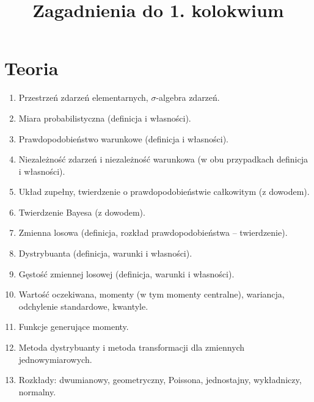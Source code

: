 \documentclass[polish]{article}
\title{Zagadnienia do 1. kolokwium}
\author{}
\date{}
\begin{document}
\maketitle

\section{Teoria}
\begin{enumerate}
    \item Przestrzeń zdarzeń elementarnych, $\sigma$-algebra zdarzeń. 
    \item Miara probabilistyczna (definicja i własności).
    \item Prawdopodobieństwo warunkowe (definicja i własności).
    \item Niezależność zdarzeń i niezależność warunkowa (w obu przypadkach definicja i własności).
    \item Układ zupełny, twierdzenie o prawdopodobieństwie całkowitym (z dowodem).
    \item Twierdzenie Bayesa (z dowodem).
    \item Zmienna losowa (definicja, rozkład prawdopodobieństwa -- twierdzenie).
    \item Dystrybuanta (definicja, warunki i własności).
    \item Gęstość zmiennej losowej (definicja, warunki i własności).
    \item Wartość oczekiwana, momenty (w tym momenty centralne), wariancja, odchylenie standardowe, kwantyle.
    \item Funkcje generujące momenty.
    \item Metoda dystrybuanty i metoda transformacji dla zmiennych jednowymiarowych.
    \item Rozkłady: dwumianowy, geometryczny, Poissona, jednostajny, wykładniczy, normalny.
\end{enumerate}
\end{document}
